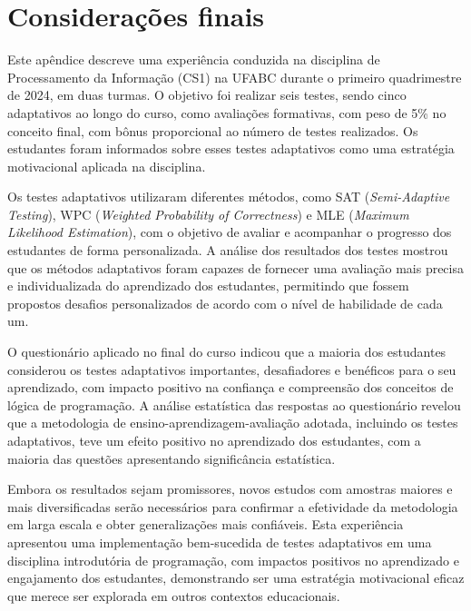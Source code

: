 \section{Considerações finais}

Este apêndice descreve uma experiência conduzida na disciplina de Processamento da Informação (CS1) na UFABC durante o primeiro quadrimestre de 2024, em duas turmas. O objetivo foi realizar seis testes, sendo cinco adaptativos ao longo do curso, como avaliações formativas, com peso de 5\% no conceito final, com bônus proporcional ao número de testes realizados. Os estudantes foram informados sobre esses testes adaptativos como uma estratégia motivacional aplicada na disciplina.

Os testes adaptativos utilizaram diferentes métodos, como SAT (\textit{Semi-Adaptive Testing}), WPC (\textit{Weighted Probability of Correctness}) e MLE (\textit{Maximum Likelihood Estimation}), com o objetivo de avaliar e acompanhar o progresso dos estudantes de forma personalizada. A análise dos resultados dos testes mostrou que os métodos adaptativos foram capazes de fornecer uma avaliação mais precisa e individualizada do aprendizado dos estudantes, permitindo que fossem propostos desafios personalizados de acordo com o nível de habilidade de cada um.

O questionário aplicado no final do curso indicou que a maioria dos estudantes considerou os testes adaptativos importantes, desafiadores e benéficos para o seu aprendizado, com impacto positivo na confiança e compreensão dos conceitos de lógica de programação. A análise estatística das respostas ao questionário revelou que a metodologia de ensino-aprendizagem-avaliação adotada, incluindo os testes adaptativos, teve um efeito positivo no aprendizado dos estudantes, com a maioria das questões apresentando significância estatística.

Embora os resultados sejam promissores, novos estudos com amostras maiores e mais diversificadas serão necessários para confirmar a efetividade da metodologia em larga escala e obter generalizações mais confiáveis. Esta experiência apresentou uma implementação bem-sucedida de testes adaptativos em uma disciplina introdutória de programação, com impactos positivos no aprendizado e engajamento dos estudantes, demonstrando ser uma estratégia motivacional eficaz que merece ser explorada em outros contextos educacionais.